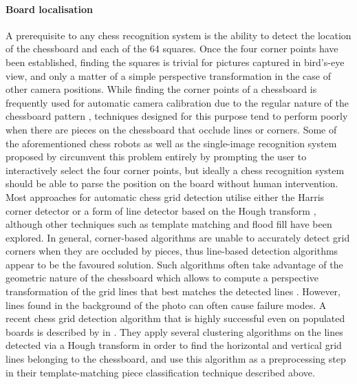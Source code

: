 \paragraph{Board localisation}
A prerequisite to any chess recognition system is the ability to detect the location of the chessboard and each of the 64 squares. 
Once the four corner points have been established, finding the squares is trivial for pictures captured in bird's-eye view, and only a matter of a simple perspective transformation in the case of other camera positions.
While finding the corner points of a chessboard is frequently used for automatic camera calibration due to the regular nature of the chessboard pattern \cite{delaescalera2010,bennett2014}, techniques designed for this purpose tend to perform poorly when there are pieces on the chessboard that occlude lines or corners.
Some of the aforementioned chess robots \cite{goncalves2005,sokic2008,khan2014} as well as the single-image recognition system proposed by \textcite{danner2015} circumvent this problem entirely by prompting the user to interactively select the four corner points, but ideally a chess recognition system should be able to parse the position on the board without human intervention.
Most approaches for automatic chess grid detection utilise either the Harris corner detector \cite{banerjee2012,hack2014} or a form of line detector based on the Hough transform \cite{tam2008,neufeld2010,danner2015,chen2016,kanchibail2016,xie2018a,chen2019}, although other techniques such as template matching \cite{matuszek2011} and flood fill \cite{wang2013} have been explored.
In general, corner-based algorithms are unable to accurately detect grid corners when they are occluded by pieces, thus line-based detection algorithms appear to be the favoured solution.
Such algorithms often take advantage of the geometric nature of the chessboard which allows to compute a perspective transformation of the grid lines that best matches the detected lines \cite{tam2008,hack2014,xie2018}.
However, lines found in the background of the photo can often cause failure modes.
A recent chess grid detection algorithm that is highly successful even on populated boards is described by \citeauthor{xie2018a} in \cite{xie2018a}. 
They apply several clustering algorithms on the lines detected via a Hough transform in order to find the horizontal and vertical grid lines belonging to the chessboard, and use this algorithm as a preprocessing step in their template-matching piece classification technique \cite{xie2018} described above. 

